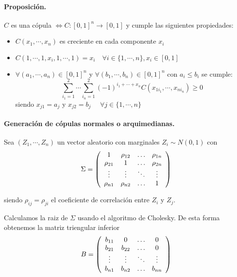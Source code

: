 \paragraph{Proposici\'on.}
$C$ es una c\'opula $\iff C:[0,1]^n \to [0,1]$ y cumple las siguientes 
propiedades:
\begin{itemize}
\item $C(x_1, \cdots, x_n)$ es creciente en cada componente $x_i$
\item $C(1, \cdots, 1, x_i, 1, \cdots, 1) = x_i \quad \forall i \in \{1, \cdots, n\}, x_i \in [0,1]$
\item $\forall (a_1, \cdots, a_n) \in [0,1]^n$ y $\forall (b_1, \cdots, b_n) \in [0,1]^n$ con
$a_i \leq b_i$ se cumple:
\begin{displaymath}
\sum_{i_1=1}^{2} \cdots \sum_{i_n=1}^{2} (-1)^{i_1+\cdots+x_n} C(x_{1i_1},\cdots,x_{ni_n}) \geq 0
\end{displaymath}
\noindent siendo $x_{j1}=a_j$ y $x_{j2}=b_j$ $\quad \forall j \in \{1, \cdots, n\}$
\end{itemize}

\paragraph{Generaci\'on de c\'opulas normales o arquimedianas.}

Sea $(Z_1,\cdots, Z_n)$ un vector aleatorio con marginales $Z_i \sim N(0,1)$ con
\begin{displaymath}
\Sigma = \left( 
\begin{array}{cccc}
1          & \rho_{12} & \ldots & \rho_{1n} \cr
\rho_{21} & 1          & \ldots & \rho_{2n} \cr
\vdots    & \vdots    & \ddots & \vdots   \cr
\rho_{n1} & \rho_{n2} & \ldots & 1
\end{array}
\right)
\end{displaymath}

\noindent siendo $\rho_{ij} = \rho_{ji}$ el coeficiente de correlaci\'on entre 
$Z_i$ y $Z_j$.

\noindent Calculamos la raiz de $\Sigma$ usando el algoritmo de Cholesky. 
De esta forma obtenemos la matriz triengular inferior
\begin{displaymath}
B = 
\left(
\begin{array}{cccc}
b_{11}   & 0        & \ldots & 0       \cr
b_{21}   & b_{22}   & \ldots & 0       \cr
\vdots  & \vdots  & \ddots & \vdots \cr
b_{n1}   & b_{n2}   & \ldots & b_{nn}
\end{array}
\right)
\end{displaymath}

